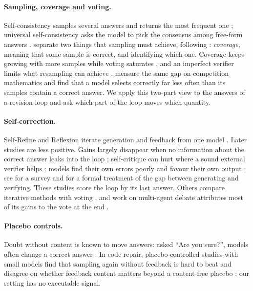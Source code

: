 \documentclass[11pt]{article}
\begin{document}
\paragraph{Sampling, coverage and voting.}
Self-consistency samples several answers and returns the most frequent one \citep{wang2023selfconsistency,aggarwal2023adaptive}; universal self-consistency asks the model to pick the consensus among free-form answers \citep{chen2023usc}.
\citet{brown2024monkeys} separate two things that sampling must achieve, following \citet{chen2021codex}: \emph{coverage}, meaning that some sample is correct, and identifying which one.
Coverage keeps growing with more samples while voting saturates \citep{chen2024morecalls}, and an imperfect verifier limits what resampling can achieve \citep{stroebl2024flaws}.
\citet{jain2026cliff} measure the same gap on competition mathematics and find that a model selects correctly far less often than its samples contain a correct answer.
We apply this two-part view to the answers of a revision loop and ask which part of the loop moves which quantity.

\paragraph{Self-correction.}
Self-Refine and Reflexion iterate generation and feedback from one model \citep{madaan2023selfrefine,shinn2023reflexion}.
Later studies are less positive.
Gains largely disappear when no information about the correct answer leaks into the loop \citep{huang2024cannot}; self-critique can hurt where a sound external verifier helps \citep{stechly2024selfverification}; models find their own errors poorly \citep{tyen2024cannot} and favour their own output \citep{xu2024pride}; see \citet{kamoi2024when} for a survey and \citet{song2024mindgap} for a formal treatment of the gap between generating and verifying.
These studies score the loop by its last answer.
Others compare iterative methods with voting \citep{bilal2026refining,wang2024token}, and work on multi-agent debate attributes most of its gains to the vote at the end \citep{smit2024mad,choi2025debate}.

\paragraph{Placebo controls.}
Doubt without content is known to move answers: asked ``Are you sure?'', models often change a correct answer \citep{laban2024flipflop}.
In code repair, placebo-controlled studies with small models find that sampling again without feedback is hard to beat and disagree on whether feedback content matters beyond a content-free placebo \citep{iscan2026falsification,iscan2026form,verma2026blind}; our setting has no executable signal.
\end{document}
